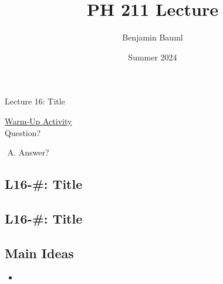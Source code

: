 \documentclass[]{article}
\title{PH 211 Lecture \Week}
\author{Benjamin Bauml}
\date{Summer 2024}
\newcommand{\Week}{16}
\begin{document}
\begin{TeacherMargin}

\end{TeacherMargin}
\begin{PresentSpace}
\begin{center}
	\huge Lecture \Week: Title
\end{center}
\vspace{0.5cm}
\underline{Warm-Up Activity} \\
Question?
\begin{enumerate}[(A)]
	\item Answer?
\end{enumerate}
\end{PresentSpace}
\newpage
\begin{TeacherMargin}

\end{TeacherMargin}
\begin{PresentSpace}
\vspace{-10pt}
\section*{L\Week-#: Title}
\vspace{-10pt}

\end{PresentSpace}
\newpage
\begin{TeacherMargin}

\end{TeacherMargin}
\begin{PresentSpace}
\vspace{-10pt}
\section*{L\Week-#: Title}
\vspace{-10pt}

\end{PresentSpace}
\newpage
\begin{TeacherMargin}
	
\end{TeacherMargin}
\begin{PresentSpace}
\section*{Main Ideas}
\begin{itemize}
	\item 
\end{itemize}
\end{PresentSpace}
\end{document}
